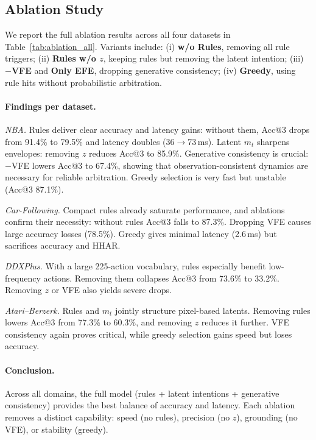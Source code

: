 \documentclass{article} %
\begin{document}
\subsection{Ablation Study}
\label{Sec:C5}

We report the full ablation results across all four datasets in 
Table~\ref{tab:ablation_all}. Variants include:  
(i) \textbf{w/o Rules}, removing all rule triggers;  
(ii) \textbf{Rules w/o $z$}, keeping rules but removing the latent intention;  
(iii) \textbf{$-$VFE} and \textbf{Only EFE}, dropping generative consistency;  
(iv) \textbf{Greedy}, using rule hits without probabilistic arbitration.  

\paragraph{Findings per dataset.}
\emph{NBA.} Rules deliver clear accuracy and latency gains: without them, 
Acc@3 drops from 91.4\% to 79.5\% and latency doubles (36$\to$73\,ms).  
Latent $m_t$ sharpens envelopes: removing $z$ reduces Acc@3 to 85.9\%.  
Generative consistency is crucial: $-$VFE lowers Acc@3 to 67.4\%, 
showing that observation-consistent dynamics are necessary for reliable arbitration.  
Greedy selection is very fast but unstable (Acc@3 87.1\%).  

\emph{Car-Following.} Compact rules already saturate performance, 
and ablations confirm their necessity: without rules Acc@3 falls to 87.3\%.  
Dropping VFE causes large accuracy losses (78.5\%).  
Greedy gives minimal latency (2.6\,ms) but sacrifices accuracy and HHAR.  

\emph{DDXPlus.} With a large 225-action vocabulary, rules especially 
benefit low-frequency actions. Removing them collapses Acc@3 from 73.6\% 
to 33.2\%. Removing $z$ or VFE also yields severe drops.  

\emph{Atari--Berzerk.} Rules and $m_t$ jointly structure pixel-based latents.  
Removing rules lowers Acc@3 from 77.3\% to 60.3\%, and removing $z$ 
reduces it further. VFE consistency again proves critical, while greedy 
selection gains speed but loses accuracy.  

\paragraph{Conclusion.}
Across all domains, the full model (rules + latent intentions + 
generative consistency) provides the best balance of accuracy and latency.  
Each ablation removes a distinct capability: speed (no rules), 
precision (no $z$), grounding (no VFE), or stability (greedy).  
\end{document}
